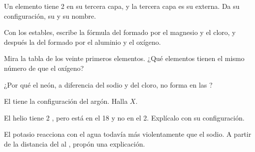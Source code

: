 \begin{exercise}[$\star\star$]\label{exo:g10:electron-shells:7}
Un elemento tiene 2  en su tercera capa, y la tercera capa es
su  externa. Da su configuración, su  y su nombre.
\end{exercise}

\begin{exercise}[$\star\star$]\label{exo:g10:electron-shells:8}
Con los  estables, escribe la fórmula del  formado
por el magnesio y el cloro, y después la del formado por el aluminio y
el oxígeno.
\end{exercise}

\begin{exercise}[$\star\star$]\label{exo:g10:electron-shells:9}
Mira la tabla de los veinte primeros elementos. ¿Qué elementos tienen el
mismo número de  que el oxígeno?
\end{exercise}

\begin{exercise}[$\star\star$]\label{exo:g10:electron-shells:10}
¿Por qué el neón, a diferencia del sodio y del cloro, no forma  en
las ?
\end{exercise}

\begin{exercise}[$\star\star$]\label{exo:g10:electron-shells:11}
El   tiene la configuración del argón. Halla $X$.
\end{exercise}

\begin{exercise}[$\star\star\star$]\label{exo:g10:electron-shells:12}
El helio tiene 2 , pero está en el  18 y no
en el  2. Explícalo con su configuración.
\end{exercise}

\begin{exercise}[$\star\star\star$]\label{exo:g10:electron-shells:13}
El potasio reacciona con el agua todavía más violentamente que el sodio.
A partir de la distancia del  al , propón una
explicación.
\end{exercise}

